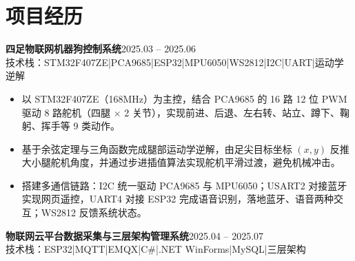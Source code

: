\documentclass[10pt,a4paper]{article}
\newcommand{\projectblock}[3]{%
    {\bfseries\color{darktext}#1}\hfill{\color{graytext}#2}\\%
    {\small\color{graytext}#3}%
    \vspace{0.2em}%
}
\begin{document}
\section{\faProjectDiagram\hspace{0.4em}项目经历}

\projectblock{四足物联网机器狗控制系统}{2025.03 -- 2025.06}{技术栈：STM32F407ZE\hspace{0.3em}|\hspace{0.3em}PCA9685\hspace{0.3em}|\hspace{0.3em}ESP32\hspace{0.3em}|\hspace{0.3em}MPU6050\hspace{0.3em}|\hspace{0.3em}WS2812\hspace{0.3em}|\hspace{0.3em}I2C\hspace{0.3em}|\hspace{0.3em}UART\hspace{0.3em}|\hspace{0.3em}运动学逆解}

\begin{itemize}[leftmargin=1.5em, itemsep=2pt, parsep=0pt, topsep=2pt]
    \item 以 STM32F407ZE（168MHz）为主控，结合 PCA9685 的 16 路 12 位 PWM 驱动 8 路舵机（四腿 $\times$ 2 关节），实现前进、后退、左右转、站立、蹲下、鞠躬、挥手等 9 类动作。
    \item 基于余弦定理与三角函数完成腿部运动学逆解，由足尖目标坐标 $(x, y)$ 反推大小腿舵机角度，并通过步进插值算法实现舵机平滑过渡，避免机械冲击。
    \item 搭建多通信链路：I2C 统一驱动 PCA9685 与 MPU6050；USART2 对接蓝牙实现网页遥控，UART4 对接 ESP32 完成语音识别，落地蓝牙、语音两种交互；WS2812 反馈系统状态。
\end{itemize}

\vspace{0.15em}

\projectblock{物联网云平台数据采集与三层架构管理系统}{2025.04 -- 2025.07}{技术栈：ESP32\hspace{0.3em}|\hspace{0.3em}MQTT\hspace{0.3em}|\hspace{0.3em}EMQX\hspace{0.3em}|\hspace{0.3em}C\#\hspace{0.3em}|\hspace{0.3em}.NET WinForms\hspace{0.3em}|\hspace{0.3em}MySQL\hspace{0.3em}|\hspace{0.3em}三层架构}
\end{document}
